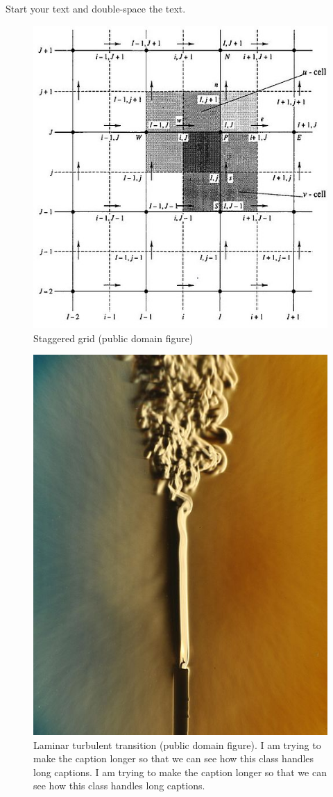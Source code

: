 \documentclass[debug, font=Times]{gw-dissertation}[2021/11/19]
\begin{document}
Start your text and double-space the text.
\begin{figure}[h!]
    \centering
    \includegraphics[width=0.5\linewidth]{grid.jpg}
    \caption{Staggered grid (public domain figure)}
\end{figure}
\begin{figure}[h!]
    \centering
    \includegraphics{laminar_turbulent_transition.jpg}
    \caption{%
        Laminar turbulent transition (public domain figure). I am trying to make the caption %
        longer so that we can see how this class handles long captions. I am trying to make the %
        caption longer so that we can see how this class handles long captions.%
    }
\end{figure}
\end{document}
